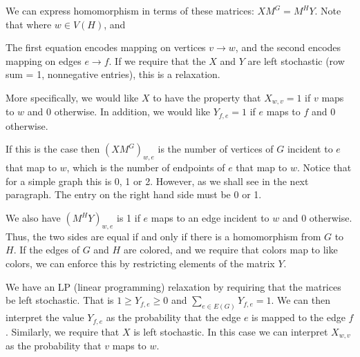 \documentclass{article}
\begin{document}
We can express homomorphism in terms of these matrices:
$X M^G = M^H Y$.  Note that
where $w \in V(H)$, and

The first equation encodes mapping on vertices $v \rightarrow w$, and
the second encodes mapping on edges $e \rightarrow f$.  If we require
that the $X$ and $Y$ are left stochastic (row sum = 1, nonnegative
entries), this is a relaxation.

More specifically, we would like $X$ to have the property that
$X_{w,v} = 1$ if $v$ maps to $w$ and 0 otherwise.  In addition, we
would like $Y_{f,e} = 1$ if $e$ maps to $f$ and 0 otherwise.

If this is the case then $(X M^G)_{w,e}$ is the number of vertices of
$G$ incident to $e$ that map to $w$, which is the number of endpoints
of $e$ that map to $w$.  Notice that for a simple graph this is 0, 1
or 2.  However, as we shall see in the next paragraph.  The entry on
the right hand side must be 0 or 1.

We also have $(M^H Y)_{w,e}$ is 1 if $e$ maps to an edge incident to
$w$ and 0 otherwise.  Thus, the two sides are equal if and only if
there is a homomorphism from $G$ to $H$.  If the edges of $G$ and $H$
are colored, and we require that colors map to like colors, we can
enforce this by restricting elements of the matrix $Y$.

We have an LP (linear programming) relaxation by requiring that the
matrices be left stochastic.  That is $1 \ge Y_{f,e} \ge 0$ and
$\sum_{e \in E(G)} Y_{f,e} = 1$.  We can then interpret the value
$Y_{f,e}$ as the probability that the edge $e$ is mapped to the edge
$f$.  Similarly, we require that $X$ is left stochastic.  In this case
we can interpret $X_{w,v}$ as the probability that $v$ maps to $w$.
\end{document}
